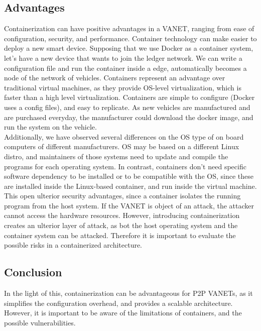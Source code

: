 \documentclass[acmsmall, screen,timestamp,nonacm]{acmart}
\begin{document}
\subsection{Advantages} %
\label{sub:advantages}
Containerization can have positive advantages in a VANET, ranging from ease of
configuration, security, and performance.
Container technology can make easier to deploy a new smart device. Supposing that
we use Docker as a container system, 
let's have a new device that wants to join the ledger network. We can write a configuration 
file and run the container inside a
edge, automatically becomes a node of the network of vehicles. Containers represent an
 advantage over traditional virtual
machines, as they provide OS-level virtualization, which is faster than a
high level virtualization. Containers are simple to
configure (Docker uses a config files), and easy to replicate. As new vehicles are
manufactured and are purchased everyday, the manufacturer could download the
docker image, and run the system on the vehicle.\\
Additionally, we have observed several differences on the OS type of on board
 computers of different manufacturers. OS may be based on a different Linux
 distro, and maintainers of those systems need to update and compile the
 programs for each operating system. In contrast, containers don't need specific
 software dependency to be installed or to be compatible with the OS, since these are installed
inside the Linux-based container, and run inside the virtual machine.
This open ulterior security advantages, since a container isolates the running 
program from the host system. If the VANET is object of an attack, the attacker
cannot access the hardware resources. However,
introducing containerization creates an ulterior layer of attack, as bot the host
operating system and the container system can be attacked. Therefore it is
important to evaluate the possible risks in a containerized architecture.

\subsection{Conclusion} %
\label{sub:conclusion}
In the light of this, containerization can be advantageous for P2P VANETs, as it
simplifies the configuration overhead, and provides a scalable architecture.
However, it is important to be aware of the limitations of containers, and the
possible vulnerabilities.





\end{document}
